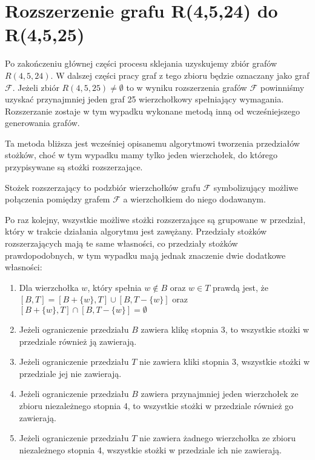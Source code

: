 \section{Rozszerzenie grafu R(4,5,24) do R(4,5,25)}

Po zakończeniu głównej części procesu sklejania uzyskujemy zbiór grafów $R(4,5,24)$. W dalszej części pracy graf z tego zbioru będzie oznaczany jako graf $\mathcal{F}$. Jeżeli zbiór $R(4,5,25) \neq \emptyset$ to w wyniku rozszerzenia grafów $\mathcal{F}$ powinniśmy uzyskać przynajmniej jeden graf 25 wierzchołkowy spełniający wymagania. 
Rozszerzanie zostaje w tym wypadku wykonane metodą inną od wcześniejszego generowania grafów.

Ta metoda bliższa jest wcześniej opisanemu algorytmowi tworzenia przedziałów stożków, choć w tym wypadku mamy tylko jeden wierzchołek, do którego przypisywane są stożki rozszerzające.
\begin{definition}
  Stożek rozszerzający to podzbiór wierzchołków grafu $\mathcal{F}$ symbolizujący możliwe połączenia pomiędzy grafem $\mathcal{F}$ a wierzchołkiem do niego dodawanym.
\end{definition}

Po raz kolejny, wszystkie możliwe stożki rozszerzające są grupowane w przedział, który w trakcie działania algorytmu jest zawężany. Przedziały stożków rozszerzających mają te same własności, co przedziały stożków prawdopodobnych, w tym wypadku mają jednak znaczenie dwie dodatkowe własności:

\begin{enumerate}
\item Dla wierzchołka $w$, który spełnia $w \notin B$ oraz $w\in T$ prawdą jest, że $[B, T] = [B + \{ w\}, T] \cup [B , T - \{ w\}]$ oraz $[B +\{ w\}, T] \cap [B , T - \{ w\}] = \emptyset$

\item Jeżeli ograniczenie przedziału $B$ zawiera klikę stopnia 3, to wszystkie stożki w przedziale również ją zawierają. 

\item Jeżeli ograniczenie przedziału $T$ nie zawiera kliki stopnia 3, wszystkie stożki w przedziale jej nie zawierają.

																													  
				 
\item Jeżeli ograniczenie przedziału $B$ zawiera przynajmniej jeden wierzchołek ze zbioru niezależnego stopnia 4, to wszystkie stożki w przedziale również go zawierają. 

\item Jeżeli ograniczenie przedziału $T$ nie zawiera żadnego wierzchołka ze zbioru niezależnego stopnia 4, wszystkie stożki w przedziale ich nie zawierają. 
\end {enumerate}



